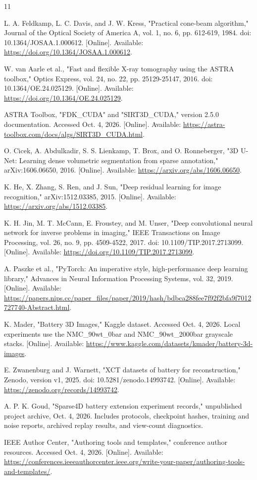\begin{thebibliography}{11}

 L. A. Feldkamp, L. C. Davis, and J. W. Kress, "Practical cone-beam algorithm," Journal of the Optical Society of America A, vol. 1, no. 6, pp. 612-619, 1984. doi: 10.1364/JOSAA.1.000612. [Online]. Available: \url{https://doi.org/10.1364/JOSAA.1.000612}.

 W. van Aarle et al., "Fast and flexible X-ray tomography using the ASTRA toolbox," Optics Express, vol. 24, no. 22, pp. 25129-25147, 2016. doi: 10.1364/OE.24.025129. [Online]. Available: \url{https://doi.org/10.1364/OE.24.025129}.

 ASTRA Toolbox, "FDK\_CUDA" and "SIRT3D\_CUDA," version 2.5.0 documentation. Accessed Oct. 4, 2026. [Online]. Available: \url{https://astra-toolbox.com/docs/algs/SIRT3D_CUDA.html}.

 O. Cicek, A. Abdulkadir, S. S. Lienkamp, T. Brox, and O. Ronneberger, "3D U-Net: Learning dense volumetric segmentation from sparse annotation," arXiv:1606.06650, 2016. [Online]. Available: \url{https://arxiv.org/abs/1606.06650}.

 K. He, X. Zhang, S. Ren, and J. Sun, "Deep residual learning for image recognition," arXiv:1512.03385, 2015. [Online]. Available: \url{https://arxiv.org/abs/1512.03385}.

 K. H. Jin, M. T. McCann, E. Froustey, and M. Unser, "Deep convolutional neural network for inverse problems in imaging," IEEE Transactions on Image Processing, vol. 26, no. 9, pp. 4509-4522, 2017. doi: 10.1109/TIP.2017.2713099. [Online]. Available: \url{https://doi.org/10.1109/TIP.2017.2713099}.

 A. Paszke et al., "PyTorch: An imperative style, high-performance deep learning library," Advances in Neural Information Processing Systems, vol. 32, 2019. [Online]. Available: \url{https://papers.nips.cc/paper_files/paper/2019/hash/bdbca288fee7f92f2bfa9f7012727740-Abstract.html}.

 K. Mader, "Battery 3D Images," Kaggle dataset. Accessed Oct. 4, 2026. Local experiments use the NMC\_90wt\_0bar and NMC\_90wt\_2000bar grayscale stacks. [Online]. Available: \url{https://www.kaggle.com/datasets/kmader/battery-3d-images}.

 E. Zwanenburg and J. Warnett, "XCT datasets of battery for reconstruction," Zenodo, version v1, 2025. doi: 10.5281/zenodo.14993742. [Online]. Available: \url{https://zenodo.org/records/14993742}.

 A. P. K. Goud, "Sparse4D battery extension experiment records," unpublished project archive, Oct. 4, 2026. Includes protocols, checkpoint hashes, training and noise reports, archived replay results, and view-count diagnostics.

 IEEE Author Center, "Authoring tools and templates," conference author resources. Accessed Oct. 4, 2026. [Online]. Available: \url{https://conferences.ieeeauthorcenter.ieee.org/write-your-paper/authoring-tools-and-templates/}.

\end{thebibliography}